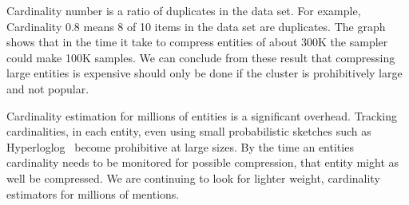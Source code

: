 Cardinality number is a ratio of duplicates in the data set.
For example, Cardinality 0.8 means 8 of 10 items in the data set are duplicates.
The graph shows that in the time it take to compress entities of about 300K
the sampler could make 100K samples.
We can conclude from these result that compressing large entities is expensive
should only be done if the cluster is prohibitively large and not popular.

Cardinality estimation for millions of entities is a significant overhead.
Tracking cardinalities, in each entity, even using small probabilistic sketches such as Hyperloglog~\cite{flajolet2008hyperloglog}
become prohibitive at large sizes.
By the time an entities cardinality needs to be monitored for possible compression, that entity might as well be compressed.
We are continuing to look for lighter weight, cardinality estimators for millions of mentions.



